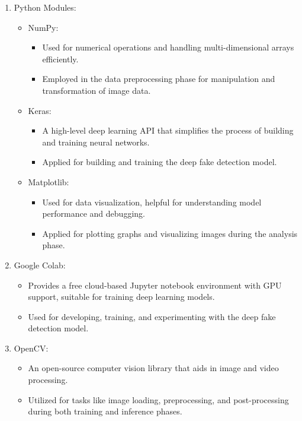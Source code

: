 \begin{enumerate}
        \item Python Modules:
        \begin{itemize}
            \item NumPy:
                \begin{itemize}
                    \item Used for numerical operations and handling multi-dimensional arrays efficiently.
                    \item Employed in the data preprocessing phase for manipulation and transformation of image data.
                \end{itemize}
            \item Keras:
                \begin{itemize}
                    \item A high-level deep learning API that simplifies the process of building and training neural networks.
                    \item Applied for building and training the deep fake detection model.
                \end{itemize}
            \item Matplotlib:
                \begin{itemize}
                    \item Used for data visualization, helpful for understanding model performance and debugging.
                    \item Applied for plotting graphs and visualizing images during the analysis phase.
                \end{itemize}
        \end{itemize}
        
        \item Google Colab:
            \begin{itemize}
                \item Provides a free cloud-based Jupyter notebook environment with GPU support, suitable for training deep learning models.
                \item Used for developing, training, and experimenting with the deep fake detection model.
            \end{itemize}
        
        \item OpenCV:
            \begin{itemize}
                \item An open-source computer vision library that aids in image and video processing.
                \item Utilized for tasks like image loading, preprocessing, and post-processing during both training and inference phases.
            \end{itemize}
        

\end{enumerate}
